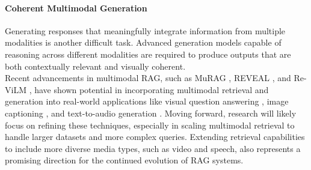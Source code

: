 \paragraph{Coherent Multimodal Generation}
Generating responses that meaningfully integrate information from multiple modalities is another difficult task. Advanced generation models capable of reasoning across different modalities are required to produce outputs that are both contextually relevant and visually coherent. \\

Recent advancements in multimodal RAG, such as MuRAG \cite{chen2022murag}, REVEAL \cite{hu2023reveal}, and Re-ViLM \cite{yang2023revilm}, have shown potential in incorporating multimodal retrieval and generation into real-world applications like visual question answering \cite{chen2023reimagen}, image captioning \cite{sarto2022retrievalaugmented}, and text-to-audio generation \cite{yuan2024retrievalaugmented}. Moving forward, research will likely focus on refining these techniques, especially in scaling multimodal retrieval to handle larger datasets and more complex queries. Extending retrieval capabilities to include more diverse media types, such as video and speech, also represents a promising direction for the continued evolution of RAG systems.